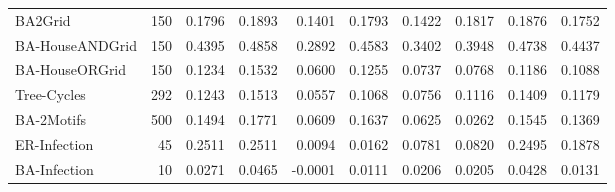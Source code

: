 \begin{table}[!htbp]
{\begin{tabular}{@{}lr rr rrrrrr@{}}
BA2Grid & 150 & 0.1796 & 0.1893 & 0.1401 & 0.1793 & 0.1422 & 0.1817 & 0.1876 & 0.1752 \\
BA-HouseANDGrid & 150 & 0.4395 & 0.4858 & 0.2892 & 0.4583 & 0.3402 & 0.3948 & 0.4738 & 0.4437 \\
BA-HouseORGrid & 150 & 0.1234 & 0.1532 & 0.0600 & 0.1255 & 0.0737 & 0.0768 & 0.1186 & 0.1088 \\
Tree-Cycles & 292 & 0.1243 & 0.1513 & 0.0557 & 0.1068 & 0.0756 & 0.1116 & 0.1409 & 0.1179 \\
BA-2Motifs & 500 & 0.1494 & 0.1771 & 0.0609 & 0.1637 & 0.0625 & 0.0262 & 0.1545 & 0.1369 \\
ER-Infection & 45 & 0.2511 & 0.2511 & 0.0094 & 0.0162 & 0.0781 & 0.0820 & 0.2495 & 0.1878 \\
BA-Infection & 10 & 0.0271 & 0.0465 & -0.0001 & 0.0111 & 0.0206 & 0.0205 & 0.0428 & 0.0131 \\
\bottomrule
\end{tabular}%
}
\end{table}
